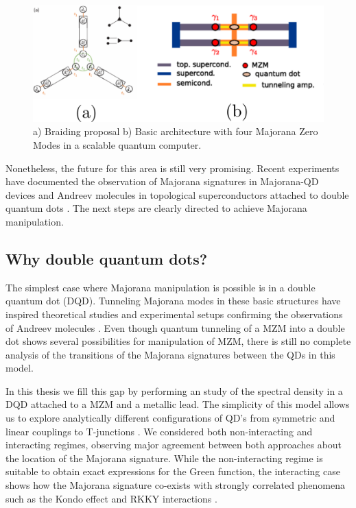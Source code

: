 \begin{figure}[H]
  \centering
  \includegraphics[scale=1]{IMAGES/Majorana/Prospective.png}
  \caption{\label{fig:braid} a) Braiding proposal b) Basic architecture with four Majorana Zero Modes in a scalable quantum computer.\protect{}}
\end{figure}

   Nonetheless, the future for this area is still very promising. Recent experiments have documented the observation of Majorana signatures in Majorana-QD devices \cite{deng_majorana_2016,deng_nonlocality_2018} and Andreev molecules in topological superconductors attached to double quantum dots \cite{su_andreev_2017}. The next steps are clearly directed to achieve Majorana manipulation. 

   \subsection{Why double quantum dots?}

    The simplest case where Majorana manipulation is possible is in a double quantum dot (DQD). Tunneling Majorana modes in these basic structures have inspired theoretical studies \cite{silva_andreev_2016,ivanov_coherent_2017,RICCO201625} and experimental setups confirming the observations of Andreev molecules \cite{su_andreev_2017}. Even though quantum tunneling of a MZM into a double dot shows several possibilities for manipulation of MZM,  there is still no complete analysis of the transitions of the Majorana signatures between the QDs in this model.

   In this thesis we fill this gap by performing an study of the spectral density in a DQD attached to a MZM and a metallic lead. The simplicity of this model allows us to explore analytically different configurations of QD's from symmetric and linear couplings to T-junctions . We considered both non-interacting and interacting regimes, observing major agreement between both approaches about the location of the Majorana signature. While the non-interacting regime is suitable to obtain exact expressions for the Green function, the interacting case  shows how the Majorana signature co-exists with strongly correlated phenomena such as the Kondo effect  and RKKY interactions \cite{ruderman_indirect_1954,kasuya_theory_1956,yosida_magnetic_1957}. 





